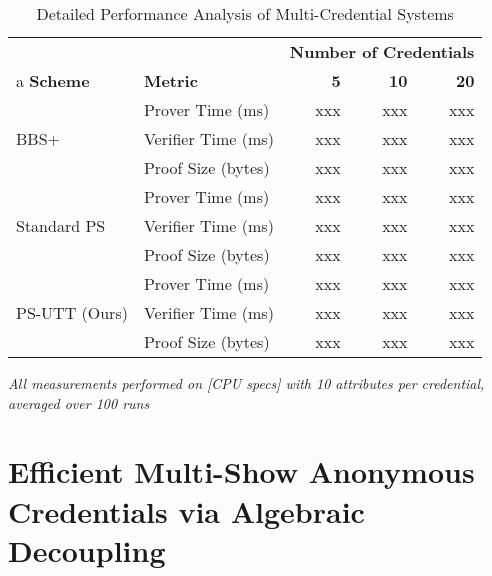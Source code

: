 \begin{table}[t]
\centering
\caption{Detailed Performance Analysis of Multi-Credential Systems}
\begin{tabular}{llrrr}
\toprule
& & \multicolumn{3}{c}{\textbf{Number of Credentials}} \\
\cmidrule(lr){3-5}a
\textbf{Scheme} & \textbf{Metric} & \textbf{5} & \textbf{10} & \textbf{20} \\
\midrule
\multirow{3}{*}{BBS+} 
& Prover Time (ms)   & xxx & xxx & xxx \\
& Verifier Time (ms) & xxx & xxx & xxx \\
& Proof Size (bytes) & xxx & xxx & xxx \\
\midrule
\multirow{3}{*}{Standard PS}
& Prover Time (ms)   & xxx & xxx & xxx \\
& Verifier Time (ms) & xxx & xxx & xxx \\
& Proof Size (bytes) & xxx & xxx & xxx \\
\midrule
\multirow{3}{*}{PS-UTT (Ours)}
& Prover Time (ms)   & xxx & xxx & xxx \\
& Verifier Time (ms) & xxx & xxx & xxx \\
& Proof Size (bytes) & xxx & xxx & xxx \\
\bottomrule
\end{tabular}
\vspace{1ex}
\begin{center}
\small\textit{All measurements performed on [CPU specs] with 10 attributes per credential, averaged over 100 runs}
\end{center}
\end{table}
























\newpage
\section{Efficient Multi-Show Anonymous Credentials via Algebraic Decoupling}



